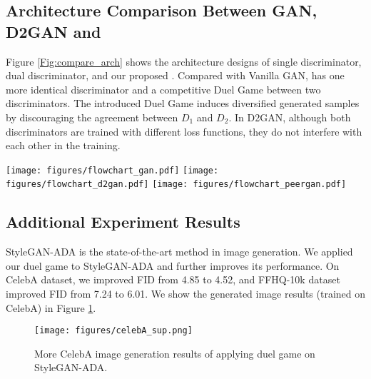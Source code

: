 \subsection{Architecture Comparison Between GAN, D2GAN and \PG{}}
Figure \ref{Fig:compare_arch} shows the architecture designs of single discriminator, dual discriminator, and our proposed \PG{}. Compared with Vanilla GAN, \PG{} has one more identical discriminator and a competitive Duel Game between two discriminators. The introduced Duel Game induces diversified generated samples by discouraging the agreement between $D_1$ and $D_2$. In D2GAN, although both discriminators are trained with different loss functions, they do not interfere with each other in the training. 
\begin{figure*}[!htb]
\vspace{-0.07in}
    \centering
    \vspace{-0.1in}
    {\texttt{[image: figures/flowchart\_gan.pdf]}
    }
    \vspace{-0.1in}
    {\texttt{[image: figures/flowchart\_d2gan.pdf]}
    }
    {\texttt{[image: figures/flowchart\_peergan.pdf]}
    }
        \vspace{-5pt}
        \caption{Architecture comparisons between GAN based method (first row), dual discriminators GAN based method (second row) and \PG{} (third row).}
    \label{Fig:compare_arch}
\end{figure*}



\subsection{Additional Experiment Results}

StyleGAN-ADA \cite{karras2020training} is the state-of-the-art method in image generation. We applied our duel game to StyleGAN-ADA and further improves its performance. On CelebA \cite{CelebA} dataset, we improved FID from 4.85 to 4.52, and FFHQ-10k\cite{karras2019style} dataset improved FID from 7.24 to 6.01. We show the generated image results (trained on CelebA) in Figure \ref{Fig:celebA_sup}.
 \begin{figure}
 \vspace{-0.1in}
    \centering
    {\texttt{[image: figures/celebA\_sup.png]}
    }
 \vspace{-0.15in}
    \caption{More CelebA image generation results of applying duel game on StyleGAN-ADA.}
 \vspace{-0.15in}
    \label{Fig:celebA_sup}
\end{figure}

